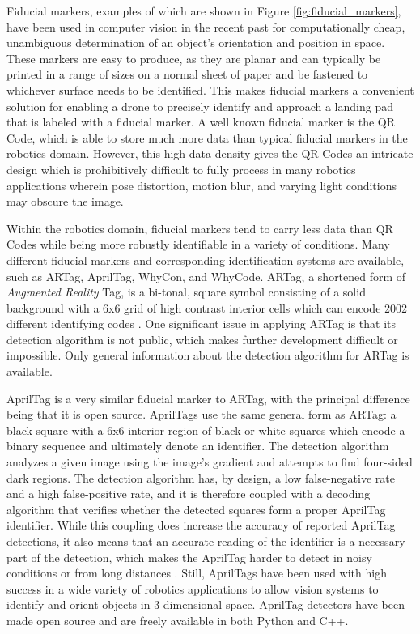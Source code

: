 Fiducial markers, examples of which are shown in Figure \ref{fig:fiducial_markers}, have been used in computer vision in the recent past for computationally cheap, unambiguous determination of an object's orientation and position in space. These markers are easy to produce, as they are planar and can typically be printed in a range of sizes on a normal sheet of paper and be fastened to whichever surface needs to be identified. This makes fiducial markers a convenient solution for enabling a drone to precisely identify and approach a landing pad that is labeled with a fiducial marker. A well known fiducial marker is the QR Code, which is able to store much more data than typical fiducial markers in the robotics domain. However, this high data density gives the QR Codes an intricate design which is prohibitively difficult to fully process in many robotics applications wherein pose distortion, motion blur, and varying light conditions may obscure the image.

Within the robotics domain, fiducial markers tend to carry less data than QR Codes while being more robustly identifiable in a variety of conditions. Many different fiducial markers and corresponding identification systems are available, such as ARTag, AprilTag, WhyCon, and WhyCode. ARTag, a shortened form of \textit{Augmented Reality} Tag, is a bi-tonal, square symbol consisting of a solid background with a 6x6 grid of high contrast interior cells which can encode 2002 different identifying codes \cite{Fiala:2005:AFM:1068508.1069138}. One significant issue in applying ARTag is that its detection algorithm is not public, which makes further development difficult or impossible. Only general information about the detection algorithm for ARTag is available.

AprilTag is a very similar fiducial marker to ARTag, with the principal difference being that it is open source. AprilTags use the same general form as ARTag: a black square with a 6x6 interior region of black or white squares which encode a binary sequence and ultimately denote an identifier. The detection algorithm analyzes a given image using the image's gradient and attempts to find four-sided dark regions. The detection algorithm has, by design, a low false-negative rate and a high false-positive rate, and it is therefore coupled with a decoding algorithm that verifies whether the detected squares form a proper AprilTag identifier. While this coupling does increase the accuracy of reported AprilTag detections, it also means that an accurate reading of the identifier is a necessary part of the detection, which makes the AprilTag harder to detect in noisy conditions or from long distances \cite{apriltag_paper}. Still, AprilTags have been used with high success in a wide variety of robotics applications to allow vision systems to identify and orient objects in 3 dimensional space. AprilTag detectors have been made open source and are freely available in both Python and C++.

